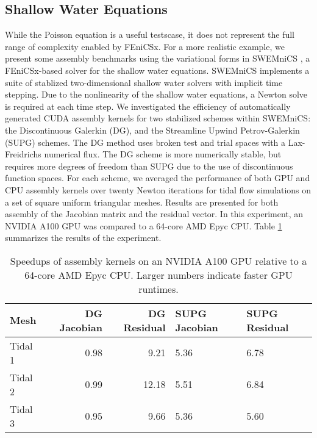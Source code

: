 \subsection*{Shallow Water Equations}

While the Poisson equation is a useful testscase, it does not represent the full range of complexity enabled by FEniCSx. For a more realistic example, we present some assembly benchmarks using the variational forms in SWEMniCS \cite{dawson2024swemnics}, a FEniCSx-based solver for the shallow water equations. SWEMniCS implements a suite of stablized two-dimensional shallow water solvers with implicit time stepping. Due to the nonlinearity of the shallow water equations, a Newton solve is required at each time step. We investigated the efficiency of automatically generated CUDA assembly kernels for two stabilized schemes within SWEMniCS: the Discontinuous Galerkin (DG), and the Streamline Upwind Petrov-Galerkin (SUPG) schemes. The DG method uses broken test and trial spaces with a Lax-Freidrichs numerical flux. The DG scheme is more numerically stable, but requires more degrees of freedom than SUPG due to the use of discontinuous function spaces. For each scheme, we averaged the performance of both GPU and CPU assembly kernels over twenty Newton iterations for tidal flow simulations on a set of square uniform triangular meshes. Results are presented for both assembly of the Jacobian matrix and the residual vector. In this experiment, an NVIDIA A100 GPU was compared to a 64-core AMD Epyc CPU.
Table \ref{tab:swe_a100_vs_epyc} summarizes the results of the experiment.
\begin{table}[t]
    \centering
    \begin{tabular}{lrrll}
\toprule
Mesh & DG Jacobian & DG Residual & SUPG Jacobian & SUPG Residual \\
\midrule
Tidal 1 & 0.98 & 9.21 & 5.36 & 6.78 \\
Tidal 2 & 0.99 & 12.18 & 5.51 & 6.84 \\
Tidal 3 & 0.95 & 9.66 & 5.36 & 5.60 \\
\bottomrule
\end{tabular}
    \caption{Speedups of assembly kernels on an NVIDIA A100 GPU relative to a 64-core AMD Epyc CPU. Larger numbers indicate faster GPU runtimes.}
    \label{tab:swe_a100_vs_epyc}
\end{table}

